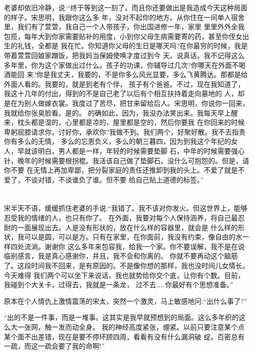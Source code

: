 \documentclass[11pt,a4paper,onecolumn]{article}
\begin{document}
老婆却依旧冷静，说:``终于等到这一刻了。而且你还要做出是我造成今天这种局面的样子。宋思明，我跟你这么多
年，没对不起你的地方。从你住在一间单人宿舍里，我们有了萱萱，我自己一个人带孩子，你出国进修一年，家里
里里外外全我包揽，每年大到你家需要贴补的用度，小到你父母生病需要寄的药，甚至你侄女出生的礼钱，全都是
我在忙。你知道你父母的生日是哪天吗?在你最穷的时候，我是带着萱萱回娘家蹭饭，把我妈当保姆使唤才度过到今
天。说真话，我不记得这么多年里，你为这个家做出过什么。孩子的功课，你辅导过几次?你哪天在外面不喝酒能回
来?你是我丈夫，我要的，不是你多么风光显要，多么飞黄腾达。那都是给外面人看的。我要的，就是到老有个伴，
孩子有个爸爸。不过，现在我知道了，我这十几年的付出，得到的不是自己老了以后有个相互扶持着走向墓地的
人，却是在为别人做嫁衣裳。我度过了苦尽，把甘来留给后人。宋思明，你说你一回来，我就给你张臭脸看。是的。
的确如此，因为，我没办法笑出来。我每天早上醒来，枕头都是湿的，心里都是凉的，屋里都是空的，然后你要我
在你回来的时候卑躬屈膝请求你，讨好你，承欢你?我做不到。我们两个，好聚好散。我不去指责你有多么的无情，
多么的忘恩负义，多么的朝三暮四，因为到我这个年纪的女人，早就该明白，男人都是一样，年轻的时候需要垫脚
石，中年的时候需要强心针，晚年的时候需要根拐棍。我活该自己做了垫脚石。没什么可抱怨的。但是，请你不要
在无情上再加卑鄙，把分裂家庭的责任还推卸到我的头上。不爱了就是不爱了，不谈对错，不谈谁负了谁。但不要
给自己贴上道德的标签。''

\section[\thesection]{}

宋半天不语，缓缓抓住老婆的手说:``我错了。我不该对你发火。但这世界上，能够忍受我的情绪的人，也只有你了。
在外面，我要对每个人保持涵养，将自己最忍耐的一面展现出去。人是没有形状的，放在什么样的容器里，就会是
什么样的形状，我可以是圆，可以是方。只有在家里，在你面前，我没有约束，像自由的水一样四处流淌。谢谢你
这么多年来包容我，给我一个家。你不要误解，我不是在说临别感言，我是真心感谢你，并且，我不会和你离的。
你就不要再动这个脑筋了。这段时间我不回来，是有原因的。不是像你想的那样，我也没时间儿女情长。今天难得
我们两个可以坐下来说话，我也就势给你交个底，让你有个数。目前，我碰到个大关卡，过得去，我就是一条龙，
过不去……你最好有个思想准备。''

原本在个人情仇上激情震荡的宋太，突然一个激灵，马上敏感地问:``出什么事了?''

``出的不是一件事，而是一堆事。这其实是我早就预想到的局面。这么多年织的这么大一张网，触一发而动全身。
我的神经高度紧张，绷紧。以前只要注意某个点某个面不出差错，现在是要不停环顾四周，看看有没有什么漏洞破
绽。百密总有一疏，而这一疏会要了我的命啊!''
\end{document}

